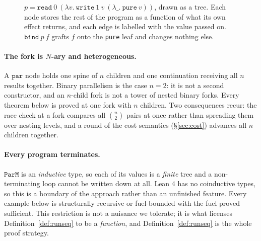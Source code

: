\documentclass[11pt,a4paper]{article}
\theoremstyle{definition}
\theoremstyle{plain}
\theoremstyle{remark}
\newcommand{\PM}{\texttt{ParM}}
\begin{document}
\begin{figure}[htb]
\centering
{}
\caption{$p = \texttt{read}\ 0\ (\lambda v.\ \texttt{write}\ 1\ v\ (\lambda\_.\ \texttt{pure}\ v))$,
drawn as a tree. Each node stores the rest of the program as a function of what its own
effect returns, and each edge is labelled with the value passed on. $\texttt{bind}\ p\ f$
grafts $f$ onto the \texttt{pure} leaf and changes nothing else.}\label{fig:graft}
\end{figure}

\paragraph{The fork is $N$-ary and heterogeneous.}
A $\texttt{par}$ node holds one spine of $n$ children and one continuation receiving all $n$
results together. Binary parallelism is the case $n = 2$: it is not a second constructor,
and an $n$-child fork is not a tower of nested binary forks. Every theorem below is proved
at one fork with $n$ children. Two consequences recur: the race check at a fork compares all
$\binom{n}{2}$ pairs at once rather than spreading them over nesting levels, and a round of
the cost semantics (\S\ref{sec:cost}) advances all $n$ children together.

\paragraph{Every program terminates.}
$\PM$ is an \emph{inductive} type, so each of its values is a \emph{finite} tree and a
non-terminating loop cannot be written down at all. Lean 4 has no coinductive types, so this
is a boundary of the approach rather than an unfinished feature. Every example below is
structurally recursive or fuel-bounded with the fuel proved sufficient. This restriction is
not a nuisance we tolerate; it is what licenses Definition~\ref{def:runseq} to be a
\emph{function}, and Definition~\ref{def:runseq} is the whole proof strategy.
\end{document}
